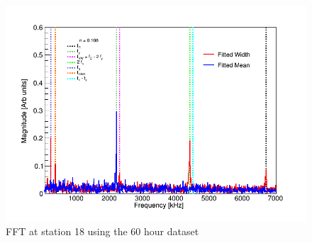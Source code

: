 \begin{figure}[ht]
\centering 
\includegraphics[scale=0.5]{Figures/FFT_fittedWidth_fittedMean_station18.png}
\decoRule
\caption{FFT at station 18 using the 60 hour dataset}
\label{fig:FFT_fittedWidth_fittedMean_station18.png}
\end{figure}

